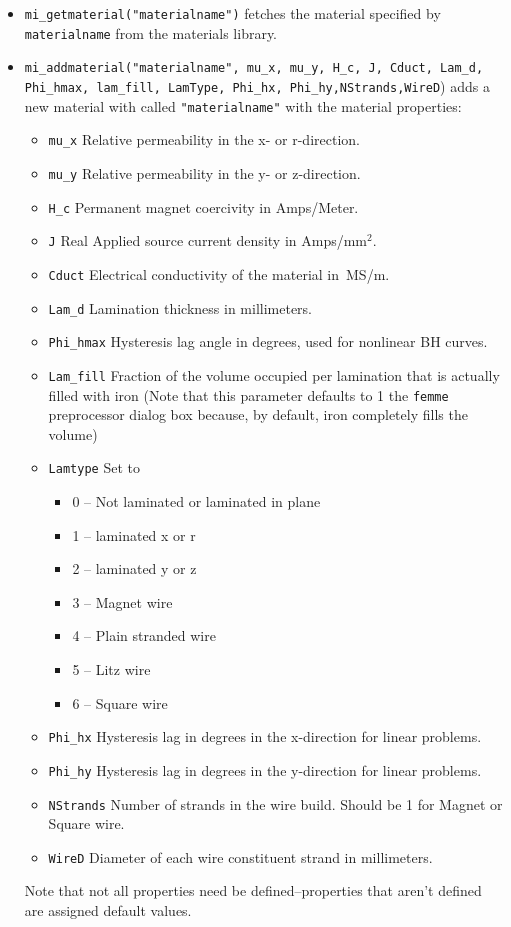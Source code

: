 \begin{itemize}
\item \texttt{mi\_getmaterial("materialname")} fetches the material specified by \texttt{materialname} 
from the materials library.

\item{\tt mi\_addmaterial("materialname", mu{\_}x, mu{\_}y, H{\_}c,
J, Cduct, Lam{\_}d, Phi{\_}hmax, lam{\_}fill, LamType, Phi{\_}hx, Phi{\_}hy,NStrands,WireD}) adds a
new material with called {\tt "materialname"} with the material
properties:
        \begin{itemize}
        \item{\tt mu{\_}x} Relative permeability in the x- or r-direction.
        \item{\tt mu{\_}y} Relative permeability in the y- or z-direction.
        \item{\tt H{\_}c} Permanent magnet coercivity in
        Amps/Meter.
        \item{\tt J} Real Applied source current density in Amps/mm$^2$.
        \item{\tt Cduct} Electrical conductivity of the material
        in~MS/m.
        \item{\tt Lam{\_}d} Lamination thickness in millimeters.
        \item{\tt Phi\_hmax} Hysteresis lag angle in degrees, used for nonlinear BH curves.
        \item{\tt Lam{\_}fill} Fraction of the volume occupied per lamination that
        is actually filled with iron (Note that this parameter defaults to 1 the
        {\tt femme} preprocessor dialog box because, by default, iron completely
        fills the volume)
        \item{\tt Lamtype} Set to
                \begin{itemize}
                \item 0 -- Not laminated or laminated in plane
                \item 1 -- laminated x or r
                \item 2 -- laminated y or z
                                \item 3 -- Magnet wire
                                \item 4 -- Plain stranded wire
                                \item 5 -- Litz wire
                                \item 6 -- Square wire
                \end{itemize}
        \item{\tt Phi\_hx} Hysteresis lag in degrees in the x-direction for linear problems.
        \item{\tt Phi\_hy} Hysteresis lag in degrees in the y-direction for linear problems.
                \item{\tt NStrands} Number of strands in the wire build.  Should be 1 for Magnet or Square wire.
                \item{\tt WireD} Diameter of each wire constituent strand in millimeters.
        \end{itemize}
Note that not all properties need be defined--properties that aren't defined are assigned default values.


\end{itemize}
